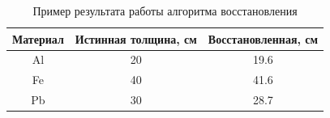 \documentclass[a4paper]{panl}
\begin{document}
\begin{table}
    \caption{Пример результата  работы алгоритма восстановления}
    \label{tab:rec}
\begin{center}
        \begin{tabular}[c]{|c|c|c|}
        \hline 
        Материал & Истинная толщина, см & Восстановленная, см \\ 
        \hline 
        Al & 20 & 19.6 \\ 
        \hline 
        Fe & 40 & 41.6 \\ 
        \hline 
        Pb & 30 & 28.7 \\ 
        \hline 
    \end{tabular}
\end{center}
\end{table}

\newpage
\end{document}

